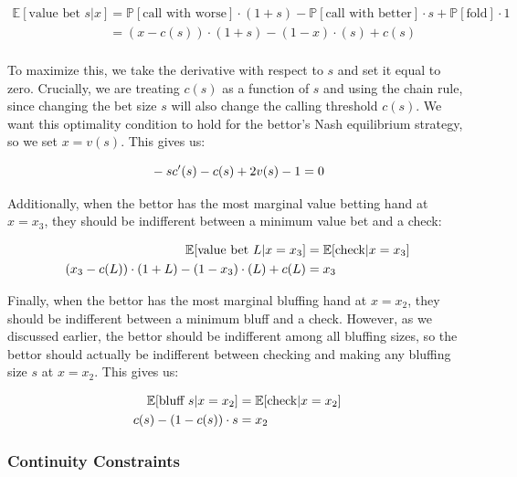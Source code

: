\documentclass[a4paper,12pt]{article}
\theoremstyle{plain}
\theoremstyle{definition}
\begin{document}
\begin{align*}
    \mathbb{E}[\text{value bet } s | x] & = \mathbb{P}[\text{call with worse}] \cdot (1+s) - \mathbb{P}[\text{call with better}] \cdot s + \mathbb{P}[\text{fold}] \cdot 1 \\
    & = (x-c(s)) \cdot (1+s) - (1-x) \cdot (s) + c(s)\\
\end{align*}

To maximize this, we take the derivative with respect to $s$ and set it equal to zero. Crucially, we are treating $c(s)$ as a function of $s$ and using the chain rule, since changing the bet size $s$ will also change the calling threshold $c(s)$. We want this optimality condition to hold for the bettor's Nash equilibrium strategy, so we set $x=v(s)$. This gives us:

\begin{equation}{\label{valueoptimality}}
    -sc'(s) - c(s) + 2 v(s) - 1 = 0
\end{equation}

Additionally, when the bettor has the most marginal value betting hand at $x=x_3$, they should be indifferent between a minimum value bet and a check: 

\begin{align}{\label{valueindiff}}
    \nonumber \mathbb{E}[\text{value bet } L | x=x_3] & = \mathbb{E}[\text{check} | x=x_3]\\ 
    (x_3-c(L)) \cdot (1+L) - (1-x_3) \cdot (L) + c(L) & = x_3
\end{align}

Finally, when the bettor has the most marginal bluffing hand at $x=x_2$, they should be indifferent between a minimum bluff and a check. However, as we discussed earlier, the bettor should be indifferent among all bluffing sizes, so the bettor should actually be indifferent between checking and making any bluffing size $s$ at $x=x_2$. This gives us:

\begin{align}{\label{bluffindiff}}
    \nonumber \mathbb{E}[\text{bluff } s | x=x_2] & = \mathbb{E}[\text{check} | x=x_2]\\ 
    c(s) - (1-c(s)) \cdot s & = x_2
\end{align}


\subsubsection{Continuity Constraints}
\end{document}
